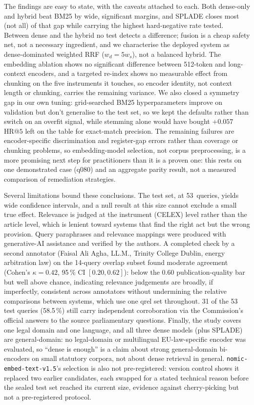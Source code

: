 \documentclass[conference,a4paper]{IEEEtran}
\makeatletter
\newcommand{\nomic}{\texttt{nomic-embed-text-v1.5}\xspace}
\newcommand{\HR}[1]{\mathrm{HR}@{#1}}
\makeatother
\begin{document}
The findings are easy to state, with the caveats attached to each.
Both dense-only and hybrid beat BM25 by wide, significant margins,
and SPLADE closes most (not all) of that gap while carrying the
highest hard-negative rate tested.
Between dense and the hybrid no test detects a difference; fusion is
a cheap safety net, not a necessary ingredient, and we characterise
the deployed system as dense-dominated weighted RRF ($w_d{=}5w_s$),
not a balanced hybrid.
The embedding ablation shows no significant difference between
512-token and long-context encoders, and a targeted re-index shows no
measurable effect from chunking on the five instruments it touches,
so encoder identity, not context length or chunking, carries the
remaining variance.
We also closed a symmetry gap in our own tuning: grid-searched BM25
hyperparameters improve on validation but don't generalise to the
test set, so we kept the defaults rather than switch on an overfit
signal, while stemming alone would have bought $+0.057$ $\HR{5}$ left
on the table for exact-match precision.
The remaining failures are encoder-specific discrimination and
register-gap errors rather than coverage or chunking problems, so
embedding-model selection, not corpus preprocessing, is a more
promising next step for practitioners than it is a proven one: this
rests on one demonstrated case (q080) and an aggregate parity result,
not a measured comparison of remediation strategies.

Several limitations bound these conclusions.
The test set, at 53~queries, yields wide confidence intervals, and a
null result at this size cannot exclude a small true effect.
Relevance is judged at the instrument (CELEX) level rather than the
article level, which is lenient toward systems that find the right
act but the wrong provision.
Query paraphrases and relevance mappings were produced with
generative-AI assistance and verified by the authors.
A completed check by a second annotator (Faisal Ali Agha, LL.M.,
Trinity College Dublin, energy arbitration law) on the 14-query
overlap subset found moderate agreement (Cohen's $\kappa{=}0.42$,
95\,\% CI $[0.20,0.62]$): below the $0.60$ publication-quality bar
but well above chance, indicating relevance judgements are broadly,
if imperfectly, consistent across annotators without undermining
the relative comparisons between systems, which use one qrel set
throughout.
31 of the 53 test queries (58.5\,\%) still carry independent
corroboration via the Commission's official answers to the source
parliamentary questions.
Finally, the study covers one legal domain and one language, and all
three dense models (plus SPLADE) are general-domain: no legal-domain
or multilingual EU-law-specific encoder was evaluated, so
``dense is enough'' is a claim about strong general-domain
bi-encoders on small statutory corpora, not about dense retrieval in
general.
\nomic's selection is also not pre-registered: version control shows
it replaced two earlier candidates, each swapped for a stated
technical reason before the sealed test set reached its current size,
evidence against cherry-picking but not a pre-registered protocol.
\end{document}
